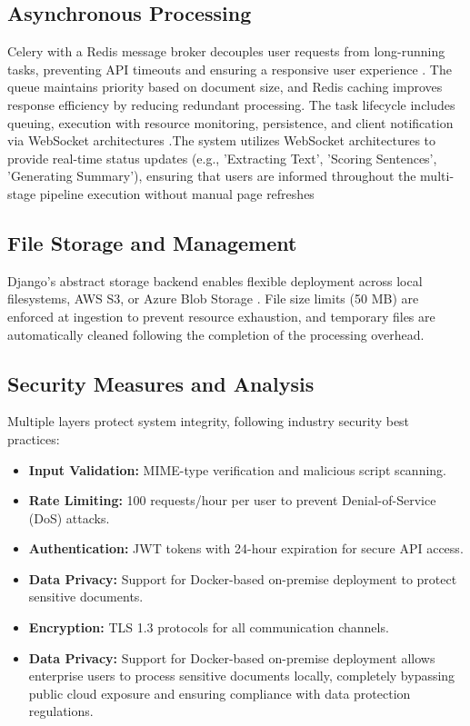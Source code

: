 \documentclass[conference]{IEEEtran}
\begin{document}
\begin{itemize}
\subsection{Asynchronous Processing}
Celery with a Redis message broker decouples user requests from long-running tasks, preventing API timeouts and ensuring a responsive user experience \cite{16}. The queue maintains priority based on document size, and Redis caching improves response efficiency by reducing redundant processing. The task lifecycle includes queuing, execution with resource monitoring, persistence, and client notification via WebSocket architectures \cite{16}.The system utilizes WebSocket architectures to provide real-time status updates (e.g., ’Extracting Text’, ’Scoring Sentences’, ’Generating Summary’), ensuring that users are informed throughout the multi-stage pipeline execution without manual page refreshes

\subsection{File Storage and Management}
Django's abstract storage backend enables flexible deployment across local filesystems, AWS S3, or Azure Blob Storage \cite{13}. File size limits (50 MB) are enforced at ingestion to prevent resource exhaustion, and temporary files are automatically cleaned following the completion of the processing overhead.

\subsection{Security Measures and Analysis}
Multiple layers protect system integrity, following industry security best practices\cite{13, 16}:
\begin{itemize}
    \item \textbf{Input Validation:} MIME-type verification and malicious script scanning\cite{13}.
    \item \textbf{Rate Limiting:} 100 requests/hour per user to prevent Denial-of-Service (DoS) attacks\cite{13, 16}.
    \item \textbf{Authentication:} JWT tokens with 24-hour expiration for secure API access\cite{13}.
    \item \textbf{Data Privacy:} Support for Docker-based on-premise deployment to protect sensitive documents\cite{7, 13}.
    \item \textbf{Encryption:} TLS 1.3 protocols for all communication channels\cite{13}.
     \item \textbf{Data Privacy:} Support for Docker-based on-premise deployment allows enterprise users to process sensitive documents locally, completely bypassing public cloud exposure and ensuring compliance with data protection regulations.
\end{itemize}


\end{itemize}
\end{document}

